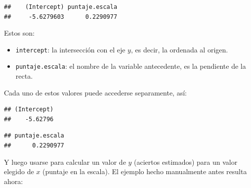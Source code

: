 \documentclass[]{book}
\newenvironment{Shaded}{\begin{snugshade}}{\end{snugshade}}
\newcommand{\DecValTok}[1]{\textcolor[rgb]{0.00,0.00,0.81}{#1}}
\newcommand{\FloatTok}[1]{\textcolor[rgb]{0.00,0.00,0.81}{#1}}
\newcommand{\NormalTok}[1]{#1}
\newcommand{\OperatorTok}[1]{\textcolor[rgb]{0.81,0.36,0.00}{\textbf{#1}}}
\newcommand{\StringTok}[1]{\textcolor[rgb]{0.31,0.60,0.02}{#1}}
\begin{document}
\begin{verbatim}
##    (Intercept) puntaje.escala 
##     -5.6279603      0.2290977
\end{verbatim}

Estos son:

\begin{itemize}
\item
  \texttt{intercept}: la intersección con el eje \(y\), es decir, la ordenada al origen.
\item
  \texttt{puntaje.escala}: el nombre de la variable antecedente, es la pendiente de la recta.
\end{itemize}

Cada uno de estos valores puede accederse separamente, así:

\begin{Shaded}
\end{Shaded}

\begin{verbatim}
## (Intercept) 
##    -5.62796
\end{verbatim}

\begin{Shaded}
\end{Shaded}

\begin{verbatim}
## puntaje.escala 
##      0.2290977
\end{verbatim}

Y luego usarse para calcular un valor de \(y\) (aciertos estimados) para un valor elegido de \(x\) (puntaje en la escala). El ejemplo hecho manualmente antes resulta ahora:

\begin{Shaded}
\end{Shaded}
\end{document}
